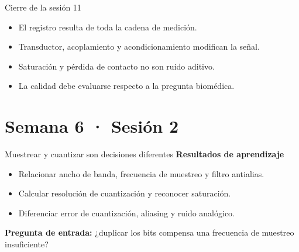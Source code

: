 \documentclass[
  ignorenonframetext,
  aspectratio=169,
  spanish,
  professionalfonts]{beamer}
\providecommand{\tightlist}{%
  \setlength{\itemsep}{0pt}\setlength{\parskip}{0pt}}
\begin{document}
\begin{frame}{Cierre de la sesión 11}
\protect{}\label{cierre-de-la-sesiuxf3n-11}
\begin{tcolorbox}[enhanced jigsaw, arc=.35mm, bottomrule=.15mm, bottomtitle=1mm, breakable, colback=white, colbacktitle=quarto-callout-important-color!10!white, colframe=quarto-callout-important-color-frame, coltitle=black, left=2mm, leftrule=.75mm, opacityback=0, opacitybacktitle=0.6, rightrule=.15mm, title={Síntesis}, titlerule=0mm, toprule=.15mm, toptitle=1mm]

\begin{itemize}
\tightlist
\item
  El registro resulta de toda la cadena de medición.
\item
  Transductor, acoplamiento y acondicionamiento modifican la señal.
\item
  Saturación y pérdida de contacto no son ruido aditivo.
\item
  La calidad debe evaluarse respecto a la pregunta biomédica.
\end{itemize}

\end{tcolorbox}
\end{frame}

\section{Semana 6 · Sesión 2}\label{semana-6-sesiuxf3n-2}

\begin{frame}{Muestrear y cuantizar son decisiones diferentes}
\protect{}\label{muestrear-y-cuantizar-son-decisiones-diferentes}
\textbf{Resultados de aprendizaje}

\begin{itemize}
\tightlist
\item
  Relacionar ancho de banda, frecuencia de muestreo y filtro antialias.
\item
  Calcular resolución de cuantización y reconocer saturación.
\item
  Diferenciar error de cuantización, aliasing y ruido analógico.
\end{itemize}

\textbf{Pregunta de entrada:} ¿duplicar los bits compensa una frecuencia
de muestreo insuficiente?
\end{frame}
\end{document}
